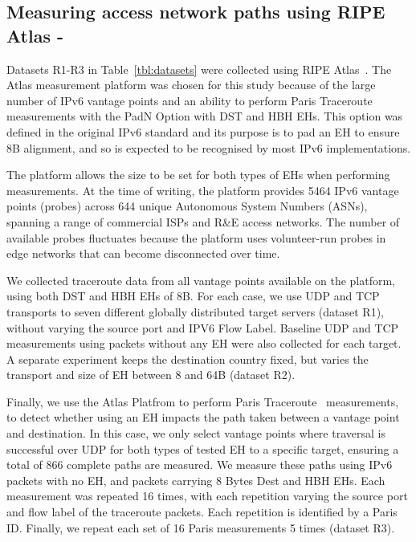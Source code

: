\documentclass[conference]{IEEEtran}
\begin{document}
    \subsection{Measuring access network paths using RIPE Atlas - }
    \label{sec:ripe-methodology}

Datasets R1-R3 in Table~\ref{tbl:datasets} were collected using RIPE Atlas~\cite{bajpai2015lessons}.
The Atlas measurement platform was chosen for this study because of the large number of IPv6 vantage points and an ability to perform Paris Traceroute measurements with the PadN Option with DST and HBH EHs. This option was defined in the original IPv6 standard and its purpose is to pad an EH to ensure 8B alignment, and so is expected to be recognised by most IPv6 implementations.

The platform allows the size to be set for both types of EHs when performing measurements. At the time of writing, the platform provides 5464 IPv6 vantage points (probes) across 644 unique Autonomous System Numbers (ASNs), spanning a range of commercial ISPs and R\&E access networks. The number of available probes fluctuates because the platform uses volunteer-run probes in edge networks that can become disconnected over time.

We collected traceroute data from all vantage points available on the platform, using both DST and HBH EHs of 8B. For each case, we use  UDP and TCP transports to seven different globally distributed target servers (dataset R1), without varying the source port and IPV6 Flow Label. Baseline UDP and TCP measurements using packets without any EH were also collected for each target.
A separate experiment keeps the destination country fixed, but varies the transport and size of EH between 8 and 64B (dataset R2).

Finally, we use the Atlas Platfrom to perform Paris Traceroute~\cite{augustin2006avoiding} measurements, to detect whether using an EH impacts the path taken between a vantage point and destination. In this case, we only select vantage points where traversal is successful over UDP for both types of tested EH to a specific target, ensuring a total of 866 complete paths are measured.
We measure these paths using IPv6 packets with no EH, and packets carrying 8 Bytes Dest and HBH EHs. Each measurement was repeated 16 times, with each repetition varying the source port and flow label of the traceroute packets. Each repetition is identified by a Paris ID. Finally, we repeat each set of 16 Paris measurements 5 times (dataset R3).
\end{document}
